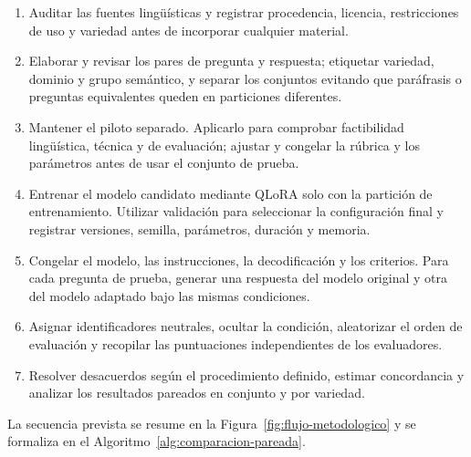 \begin{enumerate}
\item Auditar las fuentes lingüísticas y registrar procedencia, licencia, restricciones de uso y variedad antes de incorporar cualquier material.
\item Elaborar y revisar los pares de pregunta y respuesta; etiquetar variedad, dominio y grupo semántico, y separar los conjuntos evitando que paráfrasis o preguntas equivalentes queden en particiones diferentes.
\item Mantener el piloto separado. Aplicarlo para comprobar factibilidad lingüística, técnica y de evaluación; ajustar y congelar la rúbrica y los parámetros antes de usar el conjunto de prueba.
\item Entrenar el modelo candidato mediante QLoRA solo con la partición de entrenamiento. Utilizar validación para seleccionar la configuración final y registrar versiones, semilla, parámetros, duración y memoria.
\item Congelar el modelo, las instrucciones, la decodificación y los criterios. Para cada pregunta de prueba, generar una respuesta del modelo original y otra del modelo adaptado bajo las mismas condiciones.
\item Asignar identificadores neutrales, ocultar la condición, aleatorizar el orden de evaluación y recopilar las puntuaciones independientes de los evaluadores.
\item Resolver desacuerdos según el procedimiento definido, estimar concordancia y analizar los resultados pareados en conjunto y por variedad.
\end{enumerate}

La secuencia prevista se resume en la Figura~\ref{fig:flujo-metodologico} y se formaliza en el Algoritmo~\ref{alg:comparacion-pareada}.

